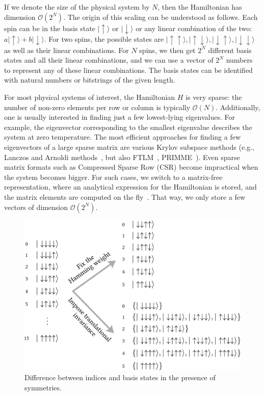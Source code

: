 If we denote the size of the physical system by $N$, then the Hamiltonian has dimension $\mathcal{O}(2^N)$. The origin of this scaling can be understood as follows. Each spin can be in the basis state $|\uparrow\rangle$ or $|\downarrow\rangle$ or any linear combination of the two: $a |\uparrow\rangle + b |\downarrow\rangle$. For two spins, the possible states are $|\uparrow\uparrow\rangle, |\uparrow\downarrow\rangle, |\downarrow\uparrow\rangle, |\downarrow\downarrow\rangle$ as well as their linear combinations. For $N$ spins, we then get $2^N$ different basis states and all their linear combinations, and we can use a vector of $2^N$ numbers to represent any of these linear combinations. The basis states can be identified with natural numbers or bitstrings of the given length.

For most physical systems of interest, the Hamiltonian $H$ is very sparse: the number of non-zero elements per row or column is typically $\mathcal{O}(N)$. Additionally, one is usually interested in finding just a few lowest-lying eigenvalues. For example, the eigenvector corresponding to the smallest eigenvalue describes the system at zero temperature. The most efficient approaches for finding a few eigenvectors of a large sparse matrix are various Krylov subspace methods (e.g., Lanczos and Arnoldi methods~\cite{Saad2003IterativeMetho}, but also FTLM~\cite{2013StronglyCorrelNumerical}, PRIMME~\cite{Statho2010Primme}). Even sparse matrix formats such as Compressed Sparse Row (CSR) become impractical when the system becomes bigger. For such cases, we switch to a matrix-free representation, where an analytical expression for the Hamiltonian is stored, and the matrix elements are computed on the fly~\cite{Waller2022TrieBasedRank}. That way, we only store a few vectors of dimension $\mathcal{O}(2^N)$.

\begin{figure}[h]
    \centering
    \includegraphics[width=0.7\linewidth]{./chapters/Proceedings_PAW_ATM_2023/symmetries.pdf}
    \caption{Difference between indices and basis states in the presence of symmetries.}
    \label{fig:ls23:symmetries}
\end{figure}

